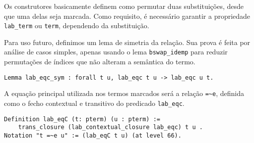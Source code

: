 Os construtores basicamente definem como permutar duas substituições, desde que
uma delas seja marcada. Como requisito, é necessário garantir a propriedade
\texttt{lab\_term} ou \texttt{term}, dependendo da substituição. 

Para uso futuro, definimos um lema de simetria da relação. Sua prova é feita por
análise de casos simples, apenas usando o lema \texttt{bswap\_idemp} para
reduzir permutações de índices que não alteram a semântica do termo.

\begin{lstlisting}[basicstyle=\small]
Lemma lab_eqc_sym : forall t u, lab_eqc t u -> lab_eqc u t.
\end{lstlisting}

A equação principal utilizada nos termos marcados será a relação 
\texttt{=\textasciitilde e}, definida como o fecho contextual e transitivo do
predicado \texttt{lab\_eqc}.

\pagebreak

\begin{lstlisting}[basicstyle=\small]
Definition lab_eqC (t: pterm) (u : pterm) :=  
    trans_closure (lab_contextual_closure lab_eqc) t u . 
Notation "t =~e u" := (lab_eqC t u) (at level 66).
\end{lstlisting}
